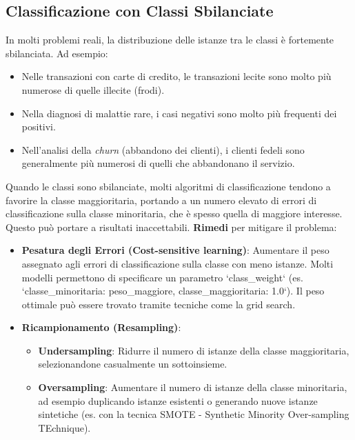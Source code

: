 \documentclass{article}
\begin{document}
\subsection{Classificazione con Classi Sbilanciate}
In molti problemi reali, la distribuzione delle istanze tra le classi è fortemente sbilanciata. Ad esempio:
\begin{itemize}
    \item Nelle transazioni con carte di credito, le transazioni lecite sono molto più numerose di quelle illecite (frodi).
    \item Nella diagnosi di malattie rare, i casi negativi sono molto più frequenti dei positivi.
    \item Nell'analisi della \textit{churn} (abbandono dei clienti), i clienti fedeli sono generalmente più numerosi di quelli che abbandonano il servizio.
\end{itemize}
Quando le classi sono sbilanciate, molti algoritmi di classificazione tendono a favorire la classe maggioritaria, portando a un numero elevato di errori di classificazione sulla classe minoritaria, che è spesso quella di maggiore interesse. Questo può portare a risultati inaccettabili.
\textbf{Rimedi} per mitigare il problema:
\begin{itemize}
    \item \textbf{Pesatura degli Errori (Cost-sensitive learning)}: Aumentare il peso assegnato agli errori di classificazione sulla classe con meno istanze. Molti modelli permettono di specificare un parametro `class\_weight` (es. `{classe\_minoritaria: peso\_maggiore, classe\_maggioritaria: 1.0}`). Il peso ottimale può essere trovato tramite tecniche come la grid search.
    \item \textbf{Ricampionamento (Resampling)}:
          \begin{itemize}
              \item \textbf{Undersampling}: Ridurre il numero di istanze della classe maggioritaria, selezionandone casualmente un sottoinsieme.
              \item \textbf{Oversampling}: Aumentare il numero di istanze della classe minoritaria, ad esempio duplicando istanze esistenti o generando nuove istanze sintetiche (es. con la tecnica SMOTE - Synthetic Minority Over-sampling TEchnique).
          \end{itemize}
\end{itemize}
\end{document}

